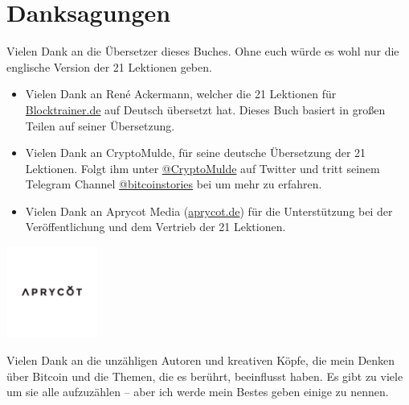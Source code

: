 \chapter*{Danksagungen}

Vielen Dank an die Übersetzer dieses Buches. Ohne euch würde es wohl nur die englische Version der
21 Lektionen geben.

\begin{itemize}
  \item Vielen Dank an René Ackermann, welcher die 21 Lektionen für
  \href{https://blocktrainer.de}{Blocktrainer.de} auf Deutsch übersetzt hat.
  Dieses Buch basiert in großen Teilen auf seiner Übersetzung.
  \item Vielen Dank an CryptoMulde, für seine deutsche Übersetzung der 21
  Lektionen. Folgt ihm unter
  \href{https://twitter.com/CryptoMulde}{@CryptoMulde} auf Twitter und tritt
  seinem Telegram Channel
  \href{https://t.me/bitcoinstories}{@bitcoinstories} bei um mehr zu erfahren.
  \item Vielen Dank an Aprycot Media (\href{https://www.aprycot.de}{aprycot.de})
  für die Unterstützung bei der Veröffentlichung und dem Vertrieb der 21
  Lektionen. 
\end{itemize}

\begin{center}
  \includegraphics[width=3cm]{assets/images/aprycot.pdf}
\end{center}

Vielen Dank an die unzähligen Autoren und kreativen Köpfe, die mein Denken über
Bitcoin und die Themen, die es berührt, beeinflusst haben. Es gibt zu viele um
sie alle aufzuzählen -- aber ich werde mein Bestes geben einige zu nennen.

